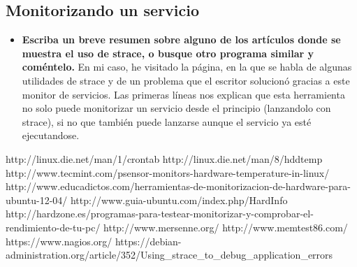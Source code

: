 \subsection{Monitorizando un servicio}
\begin{itemize}
	\item \textbf{Escriba un breve resumen sobre alguno de los artículos donde se muestra
		el uso de strace, o busque otro programa similar y coméntelo.}
	En mi caso, he visitado la página\cite{strace}, en la que se habla de algunas utilidades de strace y de un problema que el escritor solucionó gracias a este monitor de servicios. Las primeras líneas nos explican que esta herramienta no solo puede monitorizar un servicio desde el principio (lanzandolo con strace), si no que también puede lanzarse aunque el servicio ya esté ejecutandose.\\
	
\end{itemize}
\newpage
\begin{thebibliography}{xx}
	 http://linux.die.net/man/1/crontab
	 http://linux.die.net/man/8/hddtemp
	 http://www.tecmint.com/psensor-monitors-hardware-temperature-in-linux/
	 http://www.educadictos.com/herramientas-de-monitorizacion-de-hardware-para-ubuntu-12-04/
	 http://www.guia-ubuntu.com/index.php/HardInfo
	 http://hardzone.es/programas-para-testear-monitorizar-y-comprobar-el-rendimiento-de-tu-pc/
	 http://www.mersenne.org/
	 http://www.memtest86.com/
	 https://www.nagios.org/
	 https://debian-administration.org/article/352/Using_strace_to_debug_application_errors
	
\end{thebibliography}
